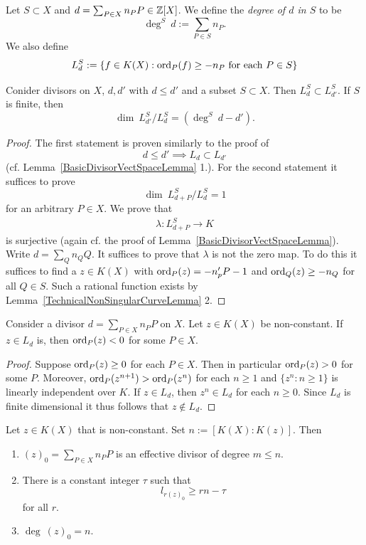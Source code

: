     \begin{definition}
        Let $S\subset X$ and $d=\sum_{P\in X} n_PP\in \mathbb{Z}[X]$. We define the \emph{degree of $d$ in $S$} to be 
        $$
            \deg^S \ d := \sum_{P\in S} n_P.   
        $$
        We also define 
        $$
            L^S_d := \left\{ f\in K(X) : \mathrm{ord}_P(f) \geq -n_P \text{ for each } P \in S\right\}
        $$
    \end{definition}
    \begin{lemma}\label{DimensionLVectorSpacesWTRASubset}
        Conider divisors on $X$, $d,d'$ with $d\leq d'$ and a subset $S\subset X$. Then $L^S_d \subset L_{d'}^S$. If $S$ is finite, then 
        $$
            \dim\ L_{d'}^S/L_d^S = \left(\deg^S\ d-d'\right).
        $$
    \end{lemma}
    \begin{proof}
        The first statement is proven similarly to the proof of 
        $$
            d\leq d'\implies L_d\subset L_{d'}
        $$
        (cf. Lemma~\ref{BasicDivisorVectSpaceLemma} 1.). For the second statement it suffices to prove 
        $$
            \dim\ L_{d+P}^S/L_d^S = 1
        $$
        for an arbitrary $P\in X$. We prove that 
        \begin{gather*}
            \lambda : L^S_{d+P} \rightarrow K
        \end{gather*}
        is surjective (again cf. the proof of Lemma~\ref{BasicDivisorVectSpaceLemma}). Write $d = \sum_{Q} n_Q Q$. It suffices to prove that $\lambda$ is not the zero map. To do this it suffices to find a $z\in K(X)$ with $\mathrm{ord}_P(z)=-n_p'P-1$ and $\mathrm{ord}_Q(z)\geq -n_Q$ for all $Q\in S$. Such a rational function exists by Lemma~\ref{TechnicalNonSingularCurveLemma} 2. 
    \end{proof}
    \begin{lemma}\label{RationalFunctionInLVectorSpaceHasSingularity}
        Consider a divisor $d=\sum_{P\in X} n_P P$ on $X$. Let $z\in K(X)$ be non-constant. If $z\in L_d$ is, then $\mathrm{ord}_P(z)<0$ for some $P\in X$. 
    \end{lemma}
    \begin{proof}
        Suppose $\mathrm{ord}_P(z)\geq 0$ for each $P\in X$. Then in particular $\mathrm{ord}_P(z)>0$ for some $P$. Moreover, $\mathrm{ord}_P(z^{n+1}) >\mathrm{ord}_P(z^n)$ for each $n\geq 1$ and $\{z^n : n\geq 1\}$ is linearly independent over $K$. If $z\in L_d$, then $z^n\in L_d$ for each $n\geq 0$. Since $L_d$ is finite dimensional it thus follows that $z\notin L_d$.
    \end{proof}
    \begin{proposition}\label{TechnicalGenusLemma}
        Let $z\in K(X)$ that is non-constant. Set $n := [K(X):K(z)]$. Then
        \begin{enumerate}
            \item $(z)_0 = \sum_{P\in X} n_P P$ is an effective divisor of degree $m\leq n$.
            \item There is a constant integer $\tau$ such that 
            $$
                l_{r(z)_0} \geq rn-\tau
            $$
            for all $r$.
            \item $\deg \ (z)_0 = n$. 
        \end{enumerate} 
    \end{proposition}
